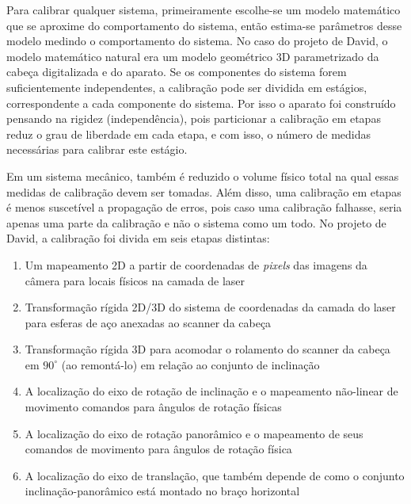 Para calibrar qualquer sistema, primeiramente escolhe-se um modelo matemático que se aproxime do comportamento do sistema, então estima-se parâmetros desse modelo medindo o comportamento do sistema. No caso do projeto de David, o modelo matemático natural era um modelo geométrico 3D parametrizado da cabeça digitalizada e do aparato. Se os componentes do sistema forem suficientemente independentes, a calibração pode ser dividida em estágios, correspondente a cada componente do sistema. Por isso o aparato foi construído pensando na rigidez (independência), pois particionar a calibração em etapas reduz o grau de liberdade em cada etapa, e com isso, o número de medidas necessárias para calibrar este estágio.

Em um sistema mecânico, também é reduzido o volume físico total na qual essas medidas de calibração devem ser tomadas. Além disso, uma calibração em etapas é menos suscetível a propagação de erros, pois caso uma calibração falhasse, seria apenas uma parte da calibração e não o sistema como um todo. No projeto de David, a calibração foi divida em seis etapas distintas:

\begin{enumerate}
\item{Um mapeamento 2D a partir de coordenadas de \emph{pixels} das imagens da câmera para locais físicos na camada de laser}
\item{Transformação rígida 2D/3D do sistema de coordenadas da camada do laser para esferas de aço anexadas ao scanner da cabeça}
\item{Transformação rígida 3D para acomodar o rolamento do scanner da cabeça em $90^{\circ}$ (ao remontá-lo) em relação ao conjunto de inclinação}
\item{A localização do eixo de rotação de inclinação e o mapeamento não-linear de movimento comandos para ângulos de rotação físicas}
\item{A localização do eixo de rotação panorâmico e o mapeamento de seus comandos de movimento para ângulos de rotação física}
\item{A localização do eixo de translação, que também depende de como o conjunto inclinação-panorâmico está montado no braço horizontal}
\end{enumerate}

